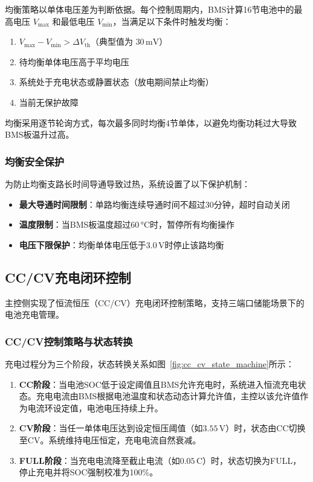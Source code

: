 均衡策略以单体电压差为判断依据。每个控制周期内，BMS计算16节电池中的最高电压 $V_{\max}$ 和最低电压 $V_{\min}$，当满足以下条件时触发均衡：

\begin{enumerate}[label=\arabic*),leftmargin=*,itemsep=0.3ex]
  \item $V_{\max}-V_{\min}>\Delta V_{\mathrm{th}}$（典型值为 $30\,\mathrm{mV}$）
  \item 待均衡单体电压高于平均电压
  \item 系统处于充电状态或静置状态（放电期间禁止均衡）
  \item 当前无保护故障
\end{enumerate}

均衡采用逐节轮询方式，每次最多同时均衡4节单体，以避免均衡功耗过大导致BMS板温升过高。

\subsubsection{均衡安全保护}

为防止均衡支路长时间导通导致过热，系统设置了以下保护机制：
\begin{itemize}[leftmargin=*,itemsep=0.3ex]
  \item \textbf{最大导通时间限制}：单路均衡连续导通时间不超过30分钟，超时自动关闭
  \item \textbf{温度限制}：当BMS板温度超过$60\,\mathrm{°C}$时，暂停所有均衡操作
  \item \textbf{电压下限保护}：均衡单体电压低于$3.0\,\mathrm{V}$时停止该路均衡
\end{itemize}

\subsection{CC/CV充电闭环控制}

主控侧实现了恒流恒压（CC/CV）充电闭环控制策略，支持三端口储能场景下的电池充电管理。

\subsubsection{CC/CV控制策略与状态转换}

充电过程分为三个阶段，状态转换关系如图~\ref{fig:cc_cv_state_machine}所示：

\begin{enumerate}[label=\arabic*),leftmargin=*,itemsep=0.3ex]
  \item \textbf{CC阶段}：当电池SOC低于设定阈值且BMS允许充电时，系统进入恒流充电状态。充电电流由BMS根据电池温度和状态动态计算允许值，主控以该允许值作为电流环设定值，电池电压持续上升。
  \item \textbf{CV阶段}：当任一单体电压达到设定恒压阈值（如$3.55\,\mathrm{V}$）时，状态由CC切换至CV。系统维持电压恒定，充电电流自然衰减。
  \item \textbf{FULL阶段}：当充电电流降至截止电流（如$0.05\,\mathrm{C}$）时，状态切换为FULL，停止充电并将SOC强制校准为100\%。
\end{enumerate}

